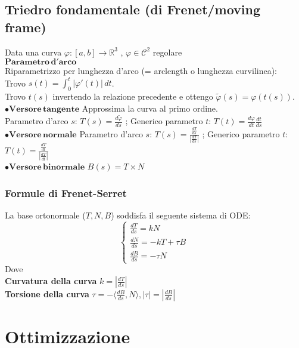 \documentclass{article} %
\begin{document}
    \subsection{Triedro fondamentale (di Frenet/moving frame)}
    Data una curva $\varphi:[a,b] \to \mathbb{R} ^3$ , $\varphi \in \mathcal{C} ^2 $ regolare \\
    $\mathbf{Parametro \, d'arco}$ \\
    Riparametrizzo per lunghezza d'arco (= arclength o lunghezza curvilinea): \\ Trovo $s(t) = \int_{0}^{t} \left| \varphi'(t) \right| \,dt $. \\ Trovo $t(s)$ invertendo la relazione precedente e ottengo $\tilde{\varphi}(s) = \varphi( t(s) )$. \\
    $\mathbf{\bullet Versore \, tangente}$
    Approssima la curva al primo ordine. \\
    Parametro d'arco $s$: $T(s)=\frac{d\tilde{\varphi}}{ds} $ ; 
    Generico parametro $t$: $T(t) = \frac{d\varphi}{dt} \frac{dt}{ds}$ \\
   $\mathbf{\bullet Versore \, normale}$
   Parametro d'arco $s$: $T(s)=\frac{ \frac{dT}{ds}}{ \left| \frac{dT}{ds} \right|}$ ; 
   Generico parametro $t$: $T(t)=\frac{ \frac{dT}{dt}}{ \left| \frac{dT}{dt} \right|}$ \\
   $ \mathbf{\bullet Versore \, binormale}$
    $ B(s) = T \times N $

    \subsubsection*{Formule di Frenet-Serret}
    La base ortonormale ($T, N, B$) soddisfa il seguente sistema di ODE:
    \begin{equation}
        \begin{cases}
            \frac{dT}{ds} = k N \\
            \frac{dN}{ds} = -kT + \tau B \\
            \frac{dB}{ds} = - \tau N
        \end{cases}\,
    \end{equation}
    Dove \\ \textbf{Curvatura della curva} $k = \left| \frac{dT}{ds} \right| $ \\ \textbf{Torsione della curva} $ \tau = - \langle \frac{dB}{ds} , N \rangle , | \tau | = | \frac{dB}{ds} |  $


    \section{Ottimizzazione}
\end{document}
